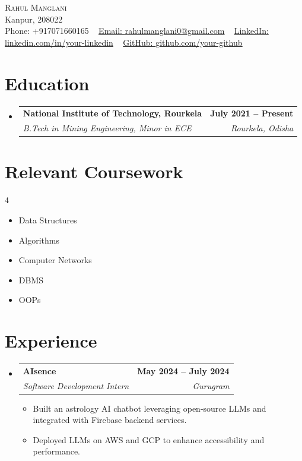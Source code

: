\documentclass[letterpaper,11pt]{article}
\makeatletter
\newcommand{\resumeItem}[1]{\item\small{#1 \vspace{-2pt}}}
\newcommand{\resumeSubheading}[4]{
\vspace{-2pt}\item
    \begin{tabular*}{1.0\textwidth}[t]{l@{\extracolsep{\fill}}r}
    \textbf{#1} & \textbf{\small #2} \\
    \textit{\small#3} & \textit{\small #4} \\
    \end{tabular*}\vspace{-7pt}
}
\newcommand{\resumeSubHeadingListStart}{\begin{itemize}[leftmargin=0.0in, label={}]}
\newcommand{\resumeSubHeadingListEnd}{\end{itemize}}
\newcommand{\resumeItemListStart}{\begin{itemize}}
\newcommand{\resumeItemListEnd}{\end{itemize}\vspace{-5pt}}
\makeatother
\begin{document}
\begin{center}
    {\Huge \scshape Rahul Manglani} \\ \vspace{1pt}
    Kanpur, 208022 \\ \vspace{1pt}
    \small Phone: +917071660165 ~ 
    \href{mailto:rahulmanglani0@gmail.com}{Email: \underline{rahulmanglani0@gmail.com}} ~
    \href{https://linkedin.com/in/your-linkedin}{LinkedIn: \underline{linkedin.com/in/your-linkedin}} ~
    \href{https://github.com/your-github}{GitHub: \underline{github.com/your-github}}
\end{center}

\section{Education}
\resumeSubHeadingListStart
    \resumeSubheading
    {National Institute of Technology, Rourkela}{July 2021 – Present}
    {B.Tech in Mining Engineering, Minor in ECE}{Rourkela, Odisha}
\resumeSubHeadingListEnd

\section{Relevant Coursework}
\begin{multicols}{4}
\begin{itemize}[itemsep=-5pt]
    \item\small Data Structures
    \item Algorithms
    \item Computer Networks
    \item DBMS
    \item OOPs
\end{itemize}
\end{multicols}

\section{Experience}
\resumeSubHeadingListStart
    \resumeSubheading
    {AIsence}{May 2024 – July 2024}
    {Software Development Intern}{Gurugram}
    \resumeItemListStart
        \resumeItem{Built an astrology AI chatbot leveraging open-source LLMs and integrated with Firebase backend services.}
        \resumeItem{Deployed LLMs on AWS and GCP to enhance accessibility and performance.}
    \resumeItemListEnd
\resumeSubHeadingListEnd
\end{document}
